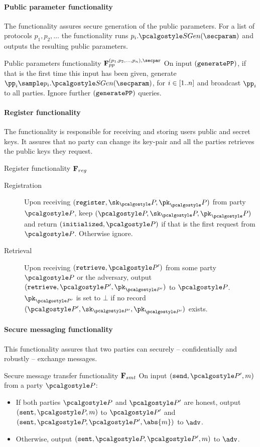 \documentclass[runningheads,10pt]{llncs}
\numberwithin{equation}{section}
\begin{document}


\paragraph{Public parameter functionality}
The functionality assures secure generation of the public parameters. For a list of
protocols $p_1, p_2, \ldots$ the functionality runs $p_i.\sgen(\secparam)$ and outputs the
resulting public parameters.
\begin{funcbox}{Public parameters functionality $\func{pp}^{(p_1, p_2, \ldots, p_n), \secpar}$}
  On input $(\mathtt{generatePP})$, if that is the first time this input has been given, generate
  $\pp_i \sample p_i.\sgen(\secparam)$, for $i \in [1 .. n]$ and broadcast $\pp_i$ to
  all parties. Ignore further $(\mathtt{generatePP})$ queries.
\end{funcbox}

\paragraph{Register functionality}
The functionality is responsible for receiving and storing users public and
secret keys. It assures that no party can change its key-pair and all the
parties retrieves the public keys they request.
\begin{funcbox}{Register functionality $\mathbf{F}_{{reg}}$}
  \begin{description}
  \item[Registration] Upon receiving $(\register, \sk_\party, \pk_\party)$ from
    party $\party$, keep $(\party, \sk_\party, \pk_\party)$ and return
    $(\initialized, \party)$ if that is the first request from $\party$.
    Otherwise ignore.
  \item[Retrieval] Upon receiving $(\retrieve, \party')$ from some party
    $\party$ or the adversary, output $(\retrieve, \party', \pk_{\party'})$ to
    $\party$. $\pk_{\party'}$ is set to $\bot$ if no record $(\party',
    \sk_{\party'}, \pk_{\party'})$ exists.
  \end{description}
\end{funcbox}

\paragraph{Secure messaging functionality}
This functionality assures that two parties can securely -- confidentially and
robustly -- exchange messages.
\begin{funcbox}{Secure message transfer functionality $\mathbf{F}_{{smt}}$} On input
  $(\send, \party', m)$ from a party $\party$:
  \begin{itemize}
  \item If both parties $\party$ and $\party'$ are honest, output $(\sent,
    \party, m)$ to $\party'$ and $(\sent, \party, \party', \abs{m})$ to $\adv$.
  \item Otherwise, output $(\sent, \party, \party', m)$ to $\adv$.
  \end{itemize}
\end{funcbox}
\end{document}
